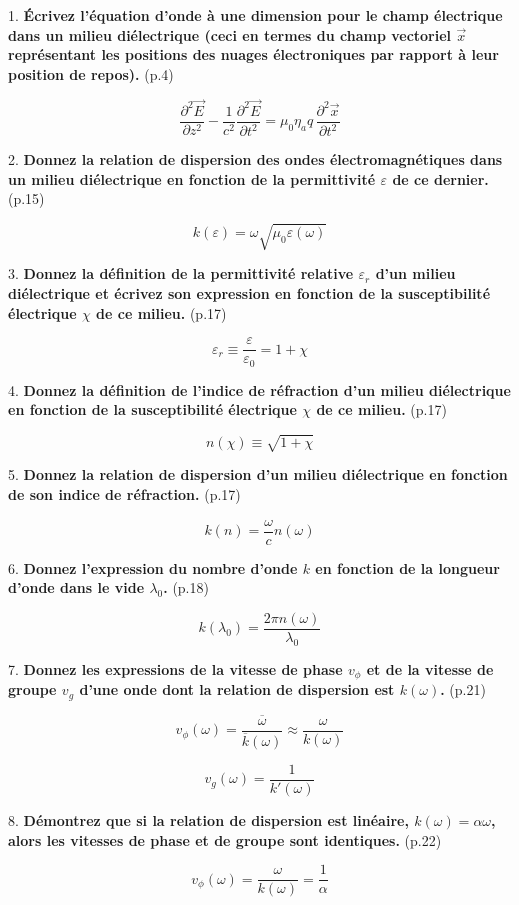\documentclass	[11pt, a4paper, openany]{book}
\newcommand{\questpm}[3]{#1. \textbf{#3} (p.#2)}
\begin{document}
\questpm{1}{4}{Écrivez l’équation d’onde à une dimension pour le champ électrique dans un milieu diélectrique (ceci en termes du champ vectoriel $\vec x$ représentant les positions des nuages électroniques par rapport à leur position de repos).}

$$ \dfrac{\partial^2\vec E}{\partial z^2} - \dfrac{1}{c^2}\dfrac{\partial^2\vec E}{\partial t^2} = \mu_0\eta_aq\,\dfrac{\partial^2\vec x}{\partial t^2}$$

\questpm{2}{15}{Donnez la relation de dispersion des ondes électromagnétiques dans un milieu diélectrique en fonction de la permittivité $\varepsilon$ de ce dernier.}

$$ k(\varepsilon) = \omega\sqrt{\mu_0\varepsilon(\omega)} $$

\questpm{3}{17}{Donnez la définition de la permittivité relative $\varepsilon_r$ d’un milieu diélectrique et écrivez son expression en fonction de la susceptibilité électrique $\chi$ de ce milieu.}

$$ \varepsilon_r \equiv \dfrac{\varepsilon}{\varepsilon_0} = 1+\chi $$

\questpm{4}{17}{Donnez la définition de l’indice de réfraction d’un milieu diélectrique en fonction de la susceptibilité électrique $\chi$ de ce milieu.}

$$ n(\chi) \equiv \sqrt{1+\chi} $$

\questpm{5}{17}{Donnez la relation de dispersion d’un milieu diélectrique en fonction de son indice de réfraction.}

$$ k(n) = \dfrac{\omega}{c}n(\omega) $$

\questpm{6}{18}{Donnez l’expression du nombre d’onde $k$ en fonction de la longueur d’onde dans le vide $\lambda_0$.}

$$ k(\lambda_0) = \dfrac{2\pi n(\omega)}{\lambda_0} $$

\questpm{7}{21}{Donnez les expressions de la vitesse de phase $v_{\phi}$ et de la vitesse de groupe $v_g$ d’une onde dont la relation de dispersion est $k(\omega )$.}

$$ v_{\phi}(\omega) = \dfrac{\overline{\omega}}{\overline{k}(\omega)} \approx \dfrac{\omega}{k(\omega)} $$

$$ v_g(\omega) = \dfrac{1}{k'(\omega)} $$

\questpm{8}{22}{Démontrez que si la relation de dispersion est linéaire, $k(\omega ) = \alpha\omega$, alors les vitesses de phase et de groupe sont identiques.}

$$ v_{\phi}(\omega) = \dfrac{\omega}{k(\omega)} = \dfrac{1}{\alpha} $$
\end{document}

